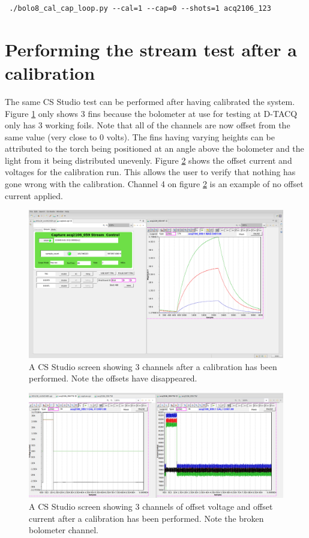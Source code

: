\documentclass{article}
\begin{document}
\begin{verbatim} ./bolo8_cal_cap_loop.py --cal=1 --cap=0 --shots=1 acq2106_123\end{verbatim}




\section{Performing the stream test after a calibration}
The same CS Studio test can be performed after having calibrated the system.
Figure \ref{3fincal} only shows 3 fins because the bolometer at use for testing at \mbox{D-TACQ} only has 3 working foils.
Note that all of the channels are now offset from the same value (very close to 0 volts).
The fins having varying heights can be attributed to the torch being positioned at an angle above the bolometer and the light from it being distributed unevenly.
Figure \ref{currentvoltage} shows the offset current and voltages for the calibration run.
This allows the user to verify that nothing has gone wrong with the calibration.
Channel 4 on figure \ref{currentvoltage} is an example of no offset current applied.

\begin{figure} [hbt!]
	\centering
	\includegraphics[width=5.0in]{images/3-fin-cal.png}
	\caption{A CS Studio screen showing 3 channels after a calibration has been performed. Note the offsets have disappeared.}
	\label{3fincal}
\end{figure}

\begin{figure} [hbt!]
	\centering
	\includegraphics[width=5.0in]{images/bolo-css-current-volts.png}
	\caption{A CS Studio screen showing 3 channels of offset voltage and offset current after a calibration has been performed. Note the broken bolometer channel.}
	\label{currentvoltage}
\end{figure}
\end{document}
